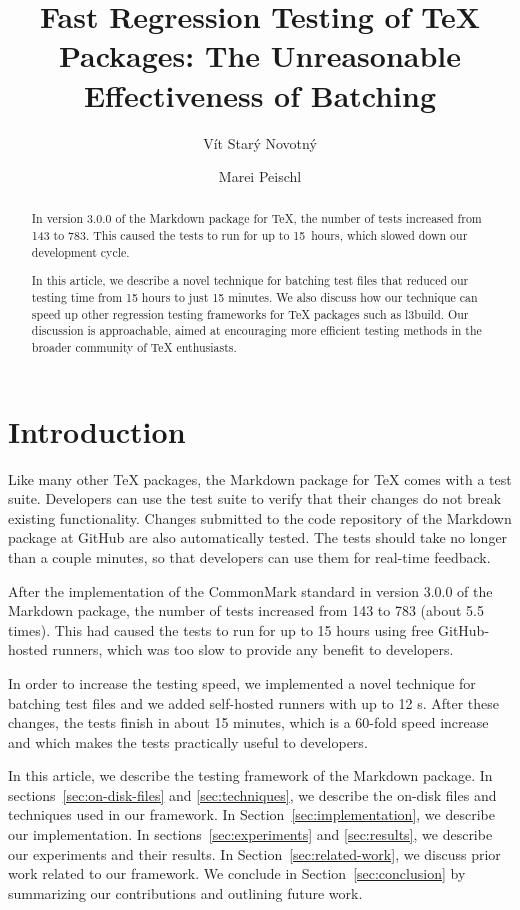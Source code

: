 \documentclass[final]{ltugboat}
\title{Fast Regression Testing of \TeX{} Packages: The Unreasonable Effectiveness of Batching}
\author{Vít Starý Novotný}
\author{Marei Peischl}
\begin{document}
\maketitle

\begin{abstract}
In version 3.0.0 of the Markdown package for \TeX, the number of tests increased from 143 to 783. This caused the tests to run for up to 15~hours, which slowed down our development cycle.

In this article, we describe a novel technique for batching test files that reduced our testing time from 15 hours to just 15 minutes. We also discuss how our technique can speed up other regression testing frameworks for \TeX{} packages such as l3build.
Our discussion is approachable, aimed at encouraging more efficient testing methods in the broader community of \TeX{} enthusiasts.
\end{abstract}

\section{Introduction}
Like many other \TeX{} packages, the Markdown package for \TeX{} comes with a test suite. Developers can use the test suite to verify that their changes do not break existing functionality. Changes submitted to the code repository of the Markdown package at GitHub are also automatically tested. The tests should take no longer than a couple minutes, so that developers can use them for real-time feedback.

After the implementation of the CommonMark standard in version 3.0.0 of the Markdown package, the number of tests increased from 143 to 783 (about 5.5 times). This had caused the tests to run for up to 15 hours using free GitHub-hosted runners, which was too slow to provide any benefit to developers.

In order to increase the testing speed, we implemented a novel technique for batching test files and we added self-hosted runners with up to 12 s. After these changes, the tests finish in about 15 minutes, which is a 60-fold speed increase and which makes the tests practically useful to developers.

In this article, we describe the testing framework of the Markdown package. In sections~\ref{sec:on-disk-files} and \ref{sec:techniques}, we describe the on-disk files and techniques used in our framework. In Section~\ref{sec:implementation}, we describe our implementation. In sections~\ref{sec:experiments} and \ref{sec:results}, we describe our experiments and their results. In Section~\ref{sec:related-work}, we discuss prior work related to our framework. We conclude in Section~\ref{sec:conclusion} by summarizing our contributions and outlining future work.
\end{document}
